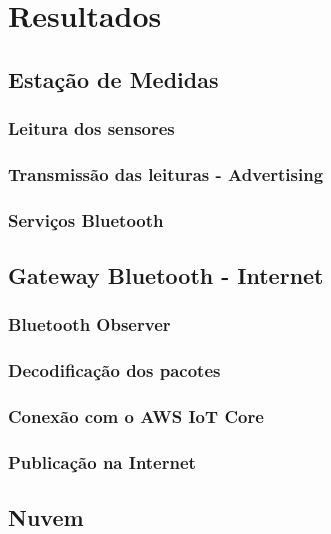 \section{Resultados}

\subsection{Estação de Medidas}

\subsubsection{Leitura dos sensores}

\subsubsection{Transmissão das leituras - Advertising}

\subsubsection{Serviços Bluetooth}

\subsection{Gateway Bluetooth - Internet}

\subsubsection{Bluetooth Observer}

\subsubsection{Decodificação dos pacotes}

\subsubsection{Conexão com o AWS IoT Core}

\subsubsection{Publicação na Internet}

\subsection{Nuvem}

